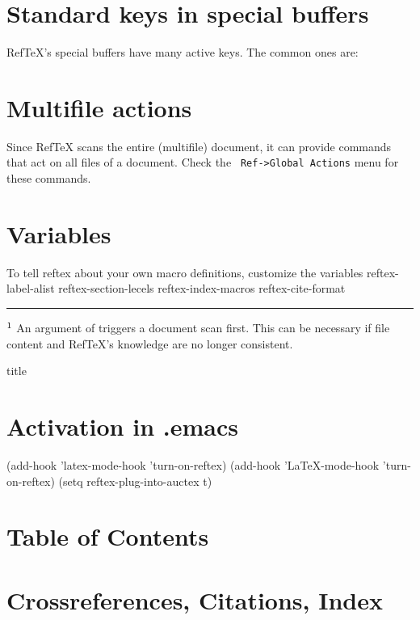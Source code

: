 \section{Standard keys in special buffers}
RefTeX's special buffers have many active keys.  The common ones are:


\section{Multifile actions}
Since RefTeX scans the entire (multifile) document, it can provide
commands that act on all files of a document.  Check the {\tt
Ref->Global Actions} menu for these commands.

\section{Variables}

To tell reftex about your own macro definitions, customize the
variables
\vskip-3mm
\beginexample
reftex-label-alist
reftex-section-lecels
reftex-index-macros
reftex-cite-format
\endexample

\vskip2mm\hrule
$\sp1$ An argument of  triggers a document scan first.  This can
be necessary if file content and RefTeX's knowledge are no longer
consistent.

\else %

\csname title

\section{Activation in .emacs}

\vskip-4mm
\beginexample
(add-hook 'latex-mode-hook 'turn-on-reftex)
(add-hook 'LaTeX-mode-hook 'turn-on-reftex)
(setq reftex-plug-into-auctex t)
\endexample

\section{Table of Contents}


\section{Crossreferences, Citations, Index}

